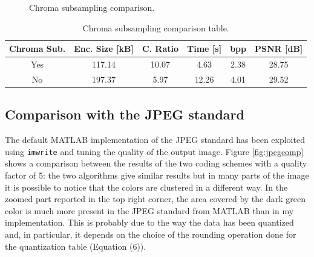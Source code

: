 \documentclass[14pt,a4paper]{extarticle}
\begin{document}
\begin{figure}[ht!]
     \begin{center}
%
    \end{center}
    \caption{Chroma subsampling comparison.}
    \label{fig:chromacomp}
\end{figure}

\begin{center}
\begin{table}[h!]
  \centering
\begin{tabular}{ |c|c|c|c|c|c| } 
\hline
Chroma Sub. & Enc. Size [kB] & C. Ratio & Time [s] & bpp & PSNR [dB] \\
\hline
Yes & 117.14 & 10.07 & 4.63 & 2.38 & 28.75 \\ 
No & 197.37 & 5.97 & 12.26 & 4.01 & 29.52 \\
\hline
\end{tabular}
\caption{Chroma subsampling comparison table.}
\label{table:chromacomp}
\end{table}
\end{center}

\subsection{Comparison with the JPEG standard}
The default MATLAB implementation of the JPEG standard has been exploited using \texttt{imwrite} and tuning the quality of the output image. Figure \ref{fig:jpegcomp} shows a comparison between the results of the two coding schemes with a quality factor of 5: the two algorithms give similar results but in many parts of the image it is possible to notice that the colors are clustered in a different way. In the zoomed part reported in the top right corner, the area covered by the dark green color is much more present in the JPEG standard from MATLAB than in my implementation. This is probably due to the way the data has been quantized and, in particular, it depends on the choice of the rounding operation done for the quantization table (Equation (6)).
\end{document}
